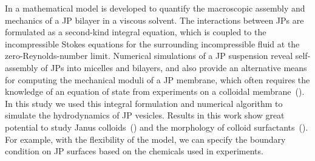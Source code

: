 \documentclass[lineno]{jfm}
\begin{document}
In \cite{Fu20} a mathematical model is developed to quantify the macroscopic assembly and mechanics of 
a JP bilayer in a viscous solvent. The interactions between JPs are formulated as a second-kind integral equation, which is coupled to the incompressible Stokes equations for the surrounding incompressible fluid at the zero-Reynolds-number limit.  Numerical simulations of a JP suspension reveal self-assembly of JPs into micelles and bilayers, and also provide an alternative means for computing the mechanical moduli of a JP membrane, which often requires the knowledge of an equation of state from experiments on a colloidal membrane~(\cite{Balchunas2019_SM}).
In this study we used this integral formulation and numerical algorithm to simulate the hydrodynamics of JP vesicles. 
%
%
Results in this work show great potential to study Janus colloids~(\cite{Bradley2017,Mallory2017}) and the morphology of colloid
surfactants~(\cite{Bradley2016}). 
%
For example, with the flexibility of the model, we can specify the boundary condition on JP surfaces based on the chemicals used in experiments. 

\end{document}
